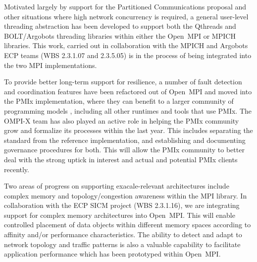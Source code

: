 Motivated largely by support for the Partitioned Communications proposal and other situations where high network concurrency is required, a general user-level threading abstraction has been developed to support both the Qthreads and BOLT/Argobots threading libraries within either the Open~MPI or MPICH libraries.  This work, carried out in collaboration with the MPICH and Argobots ECP teams (WBS 2.3.1.07 and 2.3.5.05) is in the process of being integrated into the two MPI implementations.

To provide better long-term support for resilience, a number of fault detection and coordination features have been refactored out of Open~MPI and moved into the PMIx implementation, where they can benefit to a larger community of programming models , including all other runtimes and tools that use PMIx.  The OMPI-X team has also played an active role in helping the PMIx community grow and formalize its processes within the last year.  This includes separating the standard from the reference implementation, and establishing and documenting governance procedures for both.  This will allow the PMIx community to better deal with the strong uptick in interest and actual and potential PMIx clients recently.

Two areas of progress on supporting exacale-relevant architectures include complex memory and topology/congestion awareness within the MPI library. In collaboration with the ECP SICM project (WBS 2.3.1.16), we are integrating support for complex memory architectures into Open~MPI.  This will enable controlled placement of data objects within different memory spaces according to affinity and/or performance characteristics.  The ability to detect and adapt to network topology and traffic patterns is also a valuable capability to facilitate application performance which has been prototyped within Open~MPI.

